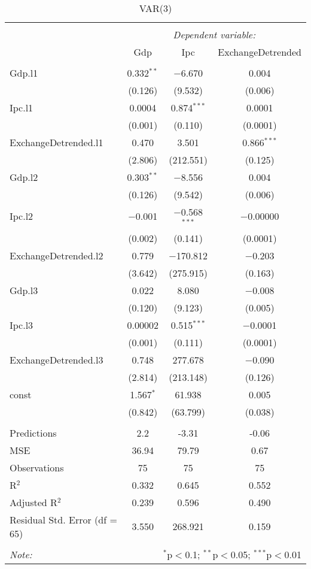 
\begin{table}[H] \centering 
  \caption{VAR(3)} 
  \label{tb:var_3} 
\begin{tabular}{@{\extracolsep{5pt}}lccc} 
\\[-1.8ex]\hline 
\hline \\[-1.8ex] 
 & \multicolumn{3}{c}{\textit{Dependent variable:}} \\ 
\cline{2-4} 
 & Gdp & Ipc & ExchangeDetrended \\ 
\hline \\[-1.8ex] 
 Gdp.l1 & 0.332$^{**}$ & $-$6.670 & 0.004 \\ 
  & (0.126) & (9.532) & (0.006) \\ 
  Ipc.l1 & 0.0004 & 0.874$^{***}$ & 0.0001 \\ 
  & (0.001) & (0.110) & (0.0001) \\ 
  ExchangeDetrended.l1 & 0.470 & 3.501 & 0.866$^{***}$ \\ 
  & (2.806) & (212.551) & (0.125) \\ 
  Gdp.l2 & 0.303$^{**}$ & $-$8.556 & 0.004 \\ 
  & (0.126) & (9.542) & (0.006) \\ 
  Ipc.l2 & $-$0.001 & $-$0.568$^{***}$ & $-$0.00000 \\ 
  & (0.002) & (0.141) & (0.0001) \\ 
  ExchangeDetrended.l2 & 0.779 & $-$170.812 & $-$0.203 \\ 
  & (3.642) & (275.915) & (0.163) \\ 
  Gdp.l3 & 0.022 & 8.080 & $-$0.008 \\ 
  & (0.120) & (9.123) & (0.005) \\ 
  Ipc.l3 & 0.00002 & 0.515$^{***}$ & $-$0.0001 \\ 
  & (0.001) & (0.111) & (0.0001) \\ 
  ExchangeDetrended.l3 & 0.748 & 277.678 & $-$0.090 \\ 
  & (2.814) & (213.148) & (0.126) \\ 
  const & 1.567$^{*}$ & 61.938 & 0.005 \\ 
  & (0.842) & (63.799) & (0.038) \\ 
 \hline \\[-1.8ex] 
Predictions & 2.2 & -3.31 & -0.06 \\ 
MSE & 36.94 & 79.79 & 0.67 \\ 
Observations & 75 & 75 & 75 \\ 
R$^{2}$ & 0.332 & 0.645 & 0.552 \\ 
Adjusted R$^{2}$ & 0.239 & 0.596 & 0.490 \\ 
Residual Std. Error (df = 65) & 3.550 & 268.921 & 0.159 \\ 
\hline 
\hline \\[-1.8ex] 
\textit{Note:}  & \multicolumn{3}{r}{$^{*}$p$<$0.1; $^{**}$p$<$0.05; $^{***}$p$<$0.01} \\ 
\end{tabular} 
\end{table} 
